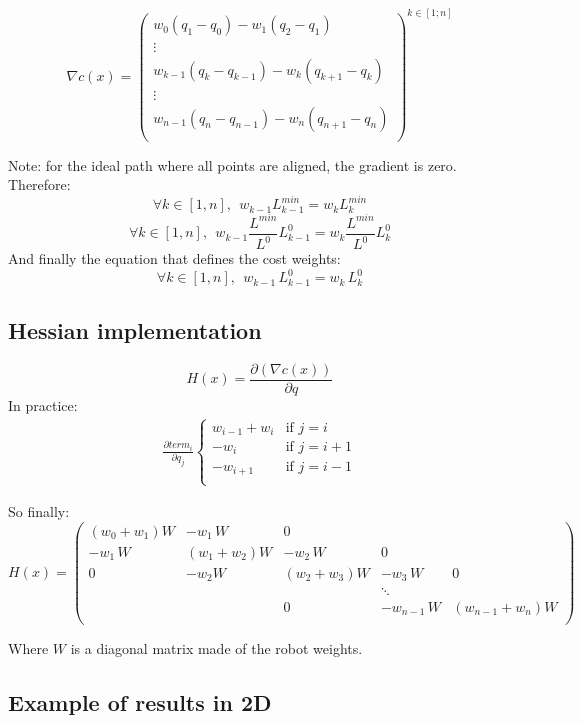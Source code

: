 \documentclass {article}
\begin{document}
$$
\nabla c(x) =
\left(\begin{array}{c}
w_0(q_{1} - q_{0}) -w_{1}(q_{2} - q_{1})\\
\vdots\\
w_{k-1}(q_{k} - q_{k-1}) -w_{k}(q_{k+1} - q_{k})\\
\vdots\\
w_{n-1}(q_{n} - q_{n-1}) -w_{n}(q_{n+1} - q_{n})\\
\end{array}
\right)^{k \in [1;n]}
$$

Note: for the ideal path where all points are aligned, the gradient is zero.
Therefore:
$$
\forall k \in [1,n], \ \ w_{k-1}L_{k-1}^{min}  = w_{k}L_k^{min}
$$
$$
\forall k \in [1,n], \ \ w_{k-1}\frac{L^{min}}{L^{0}}L_{k-1}^{0}  =
w_{k}\frac{L^{min}}{L^{0}}L_k^{0}
$$
And finally the equation that defines the cost weights:
$$
\forall k \in [1,n], \ \ w_{k-1}\,L_{k-1}^{0}  = w_{k}\,L_k^{0}
$$


\subsection{Hessian implementation}
$$
H(x) = \frac{\partial (\nabla c(x))}{\partial q}
$$
In practice:
\begin{align}
  \frac{\partial term_i}{\partial q_j}
  \begin{cases}
    w_{i-1}+w_i & \text{if }j=i\\
    -w_i  & \text{if }j=i+1\\
    -w_{i+1} & \text{if }j=i-1\\
  \end{cases}
\end{align}


So finally:
$$
H(x) =
\left(\begin{array}{ccccc}
(w_0+w_1)W & -w_1\,W & 0 & & \\
-w_1\,W & (w_1+w_2)W & -w_2\,W & 0 & \\
0 & -w_2W & (w_2+w_3)W & -w_3\,W & 0 \\
 &  &  & \ddots &  \\
 &  & 0 & -w_{n-1}\,W & (w_{n-1}+w_n)W \\
\end{array}
\right)
$$

Where $W$ is a diagonal matrix made of the robot weights.


\subsection{Example of results in 2D}
\end{document}
